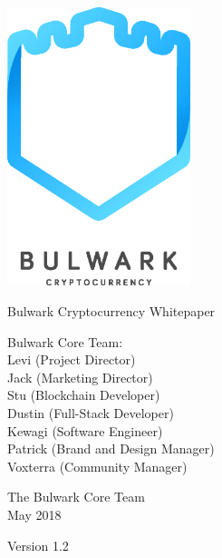 \documentclass[11pt,a4paperpaper,]{report}
\date{}
\begin{document}
\begin{titlepage}
    \begin{center}


        \includegraphics[width=0.4\textwidth]{style/bulwark.eps}

        \vspace*{2.5cm}

        \huge
        Bulwark Cryptocurrency Whitepaper

        \vspace{1.5cm}

        \vfill

        \normalsize
        Bulwark Core Team:\\
        Levi (Project Director)\\
        Jack (Marketing Director)\\
        Stu (Blockchain Developer)\\
        Dustin (Full-Stack Developer)\\
        Kewagi (Software Engineer)\\
        Patrick (Brand and Design Manager)\\
        Voxterra (Community Manager)\\
        \vspace{0.8cm}



        \normalsize
        The Bulwark Core Team\\
        May 2018

    \normalsize
    Version 1.2

    \end{center}
\end{titlepage}
\end{document}
